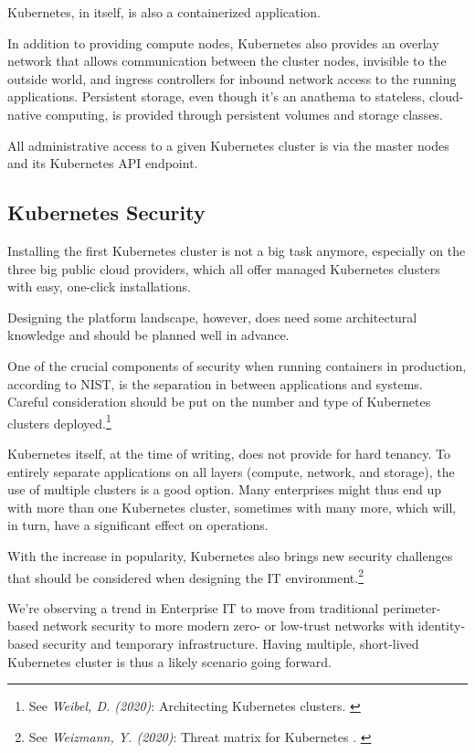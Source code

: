 Kubernetes, in itself, is also a containerized application.

In addition to providing compute nodes, Kubernetes also provides an overlay network that allows communication between the cluster nodes, invisible to the outside world, and ingress controllers for inbound network access to the running applications. Persistent storage, even though it's an anathema to stateless, cloud-native computing, is provided through persistent volumes and storage classes.

All administrative access to a given Kubernetes cluster is via the master nodes and its Kubernetes API endpoint.

\subsection{Kubernetes Security}

Installing the first Kubernetes cluster is not a big task anymore, especially on the three big public cloud providers, which all offer managed Kubernetes clusters with easy, one-click installations.

Designing the platform landscape, however, does need some architectural knowledge and should be planned well in advance.

One of the crucial components of security when running containers in production, according to NIST, is the separation in between applications and systems. Careful consideration should be put on the number and type of Kubernetes clusters deployed.\footnote{See \textit{Weibel, D. (2020)}: Architecting Kubernetes clusters. \cite{howMany}}

Kubernetes itself, at the time of writing, does not provide for hard tenancy. To entirely separate applications on all layers (compute, network, and storage), the use of multiple clusters is a good option. Many enterprises might thus end up with more than one Kubernetes cluster, sometimes with many more, which will, in turn, have a significant effect on operations.

With the increase in popularity, Kubernetes also brings new security challenges that should be considered when designing the IT environment.\footnote{See \textit{Weizmann, Y. (2020)}: Threat matrix for Kubernetes . \cite{threatMatrix}}

We're observing a trend in Enterprise IT to move from traditional perimeter-based network security to more modern zero- or low-trust networks with identity-based security and temporary infrastructure. Having multiple, short-lived Kubernetes cluster is thus a likely scenario going forward.

